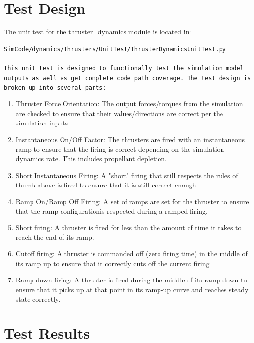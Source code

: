 \documentclass[]{LASPreport}
\begin{document}
\section{Test Design}
The unit test for the thruster\_dynamics module is located in:\\

\noindent
{\tt SimCode/dynamics/Thrusters/UnitTest/ThrusterDynamicsUnitTest.py \\
\\

\noindent This unit test is designed to functionally test the simulation model 
outputs as well as get complete code path coverage.  The test design is broken 
up into several parts:\\
\begin{enumerate}
\item{Thruster Force Orientation: The output forces/torques from the simulation 
  are checked to ensure that their values/directions are correct per the 
  simulation inputs.}
\item{Instantaneous On/Off Factor: The thrusters are fired with an 
  instantaneous ramp to ensure that the firing is correct depending on the 
  simulation dynamics rate.  This includes propellant depletion.}
\item{Short Instantaneous Firing: A "short" firing that still respects the 
  rules of thumb above is fired to ensure that it is still correct enough.}
\item{Ramp On/Ramp Off Firing: A set of ramps are set for the thruster to ensure 
  that the ramp configurationis respected during a ramped firing.}
\item{Short firing: A thruster is fired for less than the amount of time it 
   takes to reach the end of its ramp.}
\item{Cutoff firing: A thruster is commanded off (zero firing time) in the middle 
   of its ramp up to ensure that it correctly cuts off the current firing}
\item{Ramp down firing: A thruster is fired during the middle of its ramp down 
   to ensure that it picks up at that point in its ramp-up curve and reaches 
   steady state correctly.}
\end{enumerate}


\section{Test Results}


}
\end{document}
